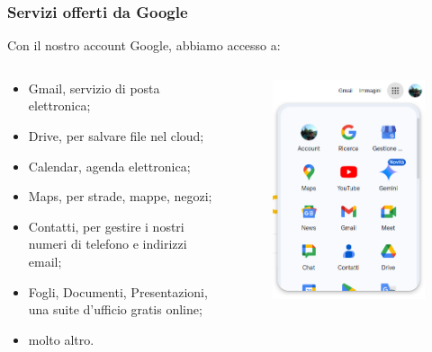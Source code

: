 \documentclass[]{beamer}
\begin{document}
\begin{frame}
\frametitle{Servizi offerti da Google}
Con il nostro account Google, abbiamo accesso a:
\begin{columns}
  \begin{column}{.6\textwidth}
\begin{itemize}
  \item \alert{Gmail}, servizio di posta elettronica;\pause
  \item \alert{Drive}, per salvare file nel cloud;\pause
  \item \alert{Calendar}, agenda elettronica;\pause
  \item \alert{Maps}, per strade, mappe, negozi;\pause
  \item \alert{Contatti}, per gestire i nostri numeri di telefono e indirizzi email;\pause
  \item \alert{Fogli, Documenti, Presentazioni}, una suite d'ufficio gratis online;
  \item molto altro.
\end{itemize}
  \end{column}
  \begin{column}{.3\textwidth}
    \begin{figure}
      \includegraphics[width=\columnwidth]{img/googleserv.png}
    \end{figure}
  \end{column}
  \end{columns}
\end{frame}
\end{document}
